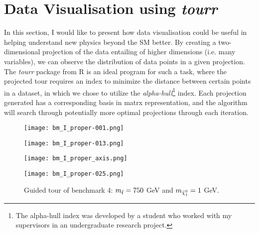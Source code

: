 \section{Data Visualisation using \textit{tourr}}
In this section, I would like to present how data visualisation could be useful in helping understand new physics beyond the SM better. By creating a two-dimensional projection of the data entailing of higher dimensions (i.e. many variables), we can observe the distribution of data points in a given projection. The \textit{tourr} package from R \cite{tourr} is an ideal program for such a task, where the projected tour requires an index to minimize the distance between certain points in a dataset, in which we chose to utilize the \textit{alpha-hull}\footnote{The alpha-hull index was developed by a student who worked with my supervisors in an undergraduate research project.} index. Each projection generated has a corresponding basis in matrx representation, and the algorithm will search through potentially more optimal projections through each iteration. 


\begin{figure}[htbp]
\centering
  \begin{minipage}[htbp]{0.49\textwidth}
    \centering
    \texttt{[image: bm\_I\_proper-001.png]}
  \end{minipage}
  \begin{minipage}[htbp]{0.49\textwidth}
    \centering
    \texttt{[image: bm\_I\_proper-013.png]}
  \end{minipage}
  \begin{minipage}[htbp]{0.49\textwidth}
    \centering
    \texttt{[image: bm\_I\_proper\_axis.png]}
  \end{minipage}
  \begin{minipage}[htbp]{0.49\textwidth}
    \centering
    \texttt{[image: bm\_I\_proper-025.png]}
  \end{minipage}
  \caption{Guided tour of benchmark 4: $m_{\Tilde{t}} = 750$ GeV and $m_{\Tilde{\chi}_1^0} = 1$ GeV. }
  \label{fig:bmIn_tour}
\end{figure}

